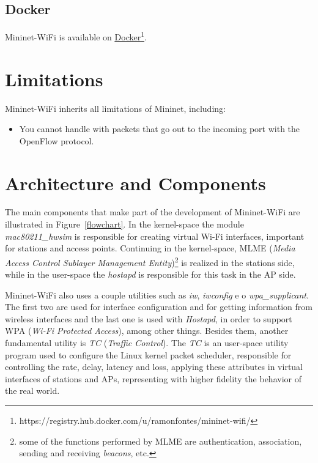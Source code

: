 \subsection{Docker}
Mininet-WiFi is available on \underline{\href{https://registry.hub.docker.com/u/ramonfontes/mininet-wifi/}{Docker}}\footnote{https://registry.hub.docker.com/u/ramonfontes/mininet-wifi/}.

\section{Limitations}
Mininet-WiFi inherits all limitations of Mininet, including:
\begin{itemize}
\item You cannot handle with packets that go out to the incoming port with the OpenFlow protocol.
\end{itemize}

\section{Architecture and Components}

The main components that make part of the development of Mininet-WiFi are illustrated in Figure~\ref{flowchart}. In the kernel-space the module \textit{mac80211\_hwsim} is responsible for creating virtual Wi-Fi interfaces, important for stations and access points. Continuing in the kernel-space, MLME (\textit{Media Access Control Sublayer Management Entity})\footnote{some of the functions performed by MLME are authentication, association, sending and receiving \textit{beacons}, etc.}  is realized in the stations side, while in the user-space the \textit{hostapd} is responsible  for this task in the AP side.

Mininet-WiFi also uses a couple utilities such as \textit{iw}, \textit{iwconfig} e o \textit{wpa\_supplicant}. The first two are used for interface configuration and for getting information from wireless interfaces and the last one is used with \textit{Hostapd}, in order to support WPA (\textit{Wi-Fi Protected Access}), among other things. Besides them, another fundamental utility is \textit{TC} (\textit{Traffic Control}). The \textit{TC} is an user-space utility program used to configure the Linux kernel packet scheduler, responsible for controlling the rate, delay, latency and loss, applying these attributes in virtual interfaces of stations and APs, representing with higher fidelity the behavior of the real world.


